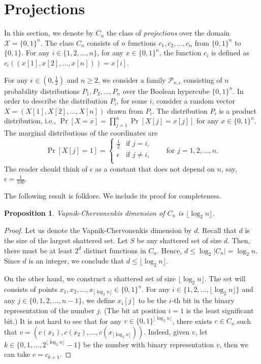 \documentclass[11pt]{article}
\newtheorem{proposition}{Proposition}
\renewcommand{\P}{\mathcal{P}}
\newcommand{\X}{\mathcal{X}}
\begin{document}
\section{Projections}
\label{section:projections}

In this section, we denote by $C_n$ the class of \emph{projections} over the
domain $\X = \{0,1\}^n$. The class $C_n$ consists of $n$ functions $c_1, c_2,
\dots, c_n$ from $\{0,1\}^n$ to $\{0,1\}$. For any $i \in \{1,2,\dots,n\}$, for
any $x \in \{0,1\}^n$, the function $c_i$ is defined as $c_i((x[1], x[2], \dots,
x[n])) = x[i]$.

For any $\epsilon \in (0,\frac{1}{2})$ and $n \ge 2$, we consider a family
$\P_{n,\epsilon}$ consisting of $n$ probability distributions $P_1, P_2, \dots,
P_n$ over the Boolean hypercube $\{0,1\}^n$. In order to describe the
distribution $P_i$, for some $i$, consider a random vector $X = (X[1], X[2],
\dots, X[n])$ drawn from $P_i$. The distribution $P_i$ is a product
distribution, i.e., $\Pr[X = x] = \prod_{j=1}^n \Pr[X[j] = x[j]]$ for any $x \in
\{0,1\}^n$. The marginal distributions of the coordinates are
$$
\Pr[X[j] = 1] =
\begin{cases}
\frac{1}{2} & \text{if $j = i$,} \\
\epsilon & \text{if $j\neq i$,} \\
\end{cases}
\qquad \text{for $j=1,2,\dots,n$.}
$$
The reader should think of $\epsilon$ as a constant that does not depend on $n$,
say, $\epsilon=\frac{1}{100}$.

The following result is folklore. We include its proof for completeness. 

\begin{proposition}
\label{proposition:vc-dimension-projections}
Vapnik-Chervonenkis dimension of $C_n$ is $\lfloor \log_2 n \rfloor$.
\end{proposition}

\begin{proof}
Let us denote the Vapnik-Chervonenkis dimension by $d$. Recall that $d$ is the
size of the largest shattered set. Let $S$ be any shattered set of size $d$.
Then, there must be at least $2^d$ distinct functions in $C_n$. Hence, $d \le
\log_2 |C_n| = \log_2 n$. Since $d$ is an integer, we conclude that $d \le
\lfloor \log_2 n \rfloor$.

On the other hand, we construct a shattered set of size $\lfloor \log_2 n
\rfloor$. The set will consists of points $x_1, x_2, \dots, x_{\lfloor \log_2 n
\rfloor} \in \{0,1\}^n$. For any $i \in \{1,2,\dots,\lfloor \log_2 n \rfloor\}$
and any $j \in \{0,1,2,\dots,n-1\}$, we define $x_i[j]$ to be the $i$-th bit
in the binary representation of the number $j$. (The bit at position $i=1$ is the
least significant bit.) It is not hard to see that for any $v \in
\{0,1\}^{\lfloor \log_2 n \rfloor}$, there exists $c \in C_n$ such that $v =
(c(x_1), c(x_2), \dots, c(x_{\lfloor \log_2 n \rfloor}))$. Indeed, given $v$,
let $k \in \{0,1,\dots,2^{\lfloor \log_2 n \rfloor} - 1\}$ be the number with
binary representation $v$, then we can take $c = c_{k+1}$.
\end{proof}
\end{document}
